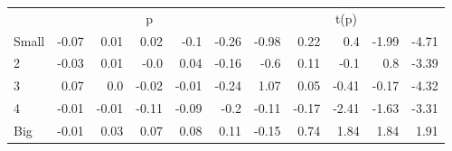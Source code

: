 \begin{table}[!ht]
\begin{tabular}{lrrrrrrrrrr}
  
    
      & \multicolumn{5}{c}{p} & \multicolumn{5}{c}{t(p)}
    
    \\
      \cmidrule(r){2-6} \cmidrule(r){7-11}

    Small   & -0.07  & 0.01  & 0.02  & -0.1  & -0.26  & -0.98  & 0.22  & 0.4  & -1.99  & -4.71  \\
         2  & -0.03  & 0.01  & -0.0  & 0.04  & -0.16  & -0.6  & 0.11  & -0.1  & 0.8  & -3.39  \\
         3  & 0.07  & 0.0  & -0.02  & -0.01  & -0.24  & 1.07  & 0.05  & -0.41  & -0.17  & -4.32  \\
         4  & -0.01  & -0.01  & -0.11  & -0.09  & -0.2  & -0.11  & -0.17  & -2.41  & -1.63  & -3.31  \\
    Big     & -0.01  & 0.03  & 0.07  & 0.08  & 0.11  & -0.15  & 0.74  & 1.84  & 1.84  & 1.91  \\

  

  \bottomrule
\end{tabular}
\label{tbl:25_Size_Beta_BS2015}
\end{table}